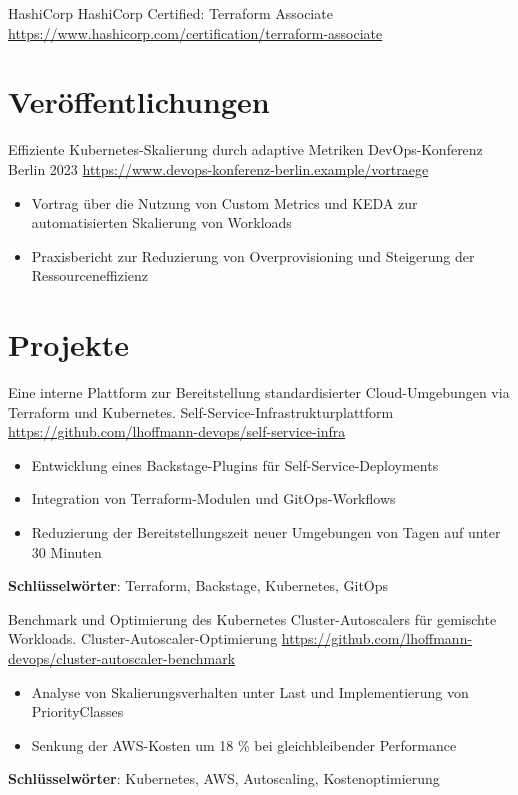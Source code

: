 \documentclass[a4paper, serif, 10pt]{moderncv}
\begin{document}
        {HashiCorp}
        {HashiCorp Certified: Terraform Associate}
        {\url{https://www.hashicorp.com/certification/terraform-associate}}
        {}
        {}
\section{Veröffentlichungen}

        {Effiziente Kubernetes-Skalierung durch adaptive Metriken}
        {DevOps-Konferenz Berlin 2023}
        {\url{https://www.devops-konferenz-berlin.example/vortraege}}
        {}
        {\begin{itemize}
\item Vortrag über die Nutzung von Custom Metrics und KEDA zur automatisierten Skalierung von Workloads
\item Praxisbericht zur Reduzierung von Overprovisioning und Steigerung der Ressourceneffizienz
\end{itemize}}
\section{Projekte}

        {Eine interne Plattform zur Bereitstellung standardisierter Cloud-Umgebungen via Terraform und Kubernetes.}
        {Self-Service-Infrastrukturplattform}
        {\url{https://github.com/lhoffmann-devops/self-service-infra}}
        {}
        {\begin{itemize}
\item Entwicklung eines Backstage-Plugins für Self-Service-Deployments
\item Integration von Terraform-Modulen und GitOps-Workflows
\item Reduzierung der Bereitstellungszeit neuer Umgebungen von Tagen auf unter 30 Minuten
\end{itemize}
\textbf{Schlüsselwörter}: Terraform, Backstage, Kubernetes, GitOps}

        {Benchmark und Optimierung des Kubernetes Cluster-Autoscalers für gemischte Workloads.}
        {Cluster-Autoscaler-Optimierung}
        {\url{https://github.com/lhoffmann-devops/cluster-autoscaler-benchmark}}
        {}
        {\begin{itemize}
\item Analyse von Skalierungsverhalten unter Last und Implementierung von PriorityClasses
\item Senkung der AWS-Kosten um 18 \% bei gleichbleibender Performance
\end{itemize}
\textbf{Schlüsselwörter}: Kubernetes, AWS, Autoscaling, Kostenoptimierung}
\end{document}
